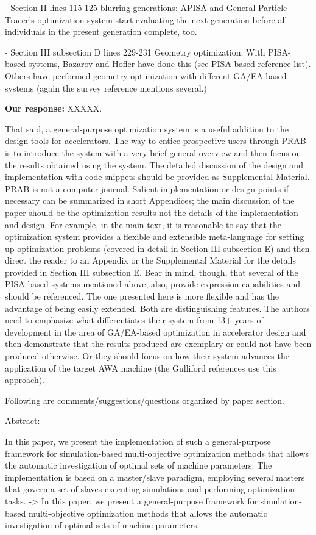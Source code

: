 \documentclass{article}
\begin{document}
- Section II lines 115-125 blurring generations: APISA and General
Particle Tracer’s optimization system start evaluating the next
generation before all individuals in the present generation complete,
too.

- Section III subsection D lines 229-231 Geometry optimization. With
PISA-based systems, Bazarov and Hofler have done this (see PISA-based
reference list). Others have performed geometry optimization with
different GA/EA based systems (again the survey reference mentions
several.)

{\bf Our response:} {\color{blue} XXXXX.}

That said, a general-purpose optimization system is a useful addition
to the design tools for accelerators. The way to entice prospective
users through PRAB is to introduce the system with a very brief
general overview and then focus on the results obtained using the
system. The detailed discussion of the design and implementation with
code snippets should be provided as Supplemental Material. PRAB is not
a computer journal. Salient implementation or design points if
necessary can be summarized in short Appendices; the main discussion
of the paper should be the optimization results not the details of the
implementation and design. For example, in the main text, it is
reasonable to say that the optimization system provides a flexible and
extensible meta-language for setting up optimization problems (covered
in detail in Section III subsection E) and then direct the reader to
an Appendix or the Supplemental Material for the details provided in
Section III subsection E. Bear in mind, though, that several of the
PISA-based systems mentioned above, also, provide expression
capabilities and should be referenced. The one presented here is more
flexible and has the advantage of being easily extended. Both are
distinguishing features. The authors need to emphasize what
differentiates their system from 13+ years of development in the area
of GA/EA-based optimization in accelerator design and then demonstrate
that the results produced are exemplary or could not have been
produced otherwise. Or they should focus on how their system advances
the application of the target AWA machine (the Gulliford references
use this approach).

Following are comments/suggestions/questions organized by paper
section.

Abstract:

In this paper, we present the implementation of such a general-purpose
framework for simulation-based multi-objective optimization methods
that allows the automatic investigation of optimal sets of machine
parameters. The implementation is based on a master/slave paradigm,
employing several masters that govern a set of slaves executing
simulations and performing optimization tasks. -> In this paper, we
present a general-purpose framework for simulation-based
multi-objective optimization methods that allows the automatic
investigation of optimal sets of machine parameters.
\end{document}
